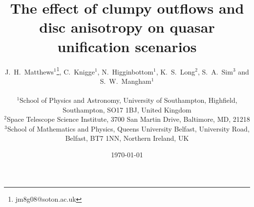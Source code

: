 \documentclass[preprint, a4paper, 11pt]{aastex}
\begin{document}


\def\py{\textsc{Python}}
\def\tar{\textsc{Tardis}}
\def\cld{\textsc{Cloudy}}
\def\agn{\textsc{Agnspec}}


\def\civ{C~\textsc{iv}}
\def\nv{N~\textsc{v}}
\def\hei{He~\textsc{i}}
\def\heii{He~\textsc{ii}}
\def\mg{Mg~\textsc{ii}}
\def\al{Al~\textsc{iii}}
\def\heii{He~\textsc{ii}}
\def\ovi{O~\textsc{vi}}
\def\la{Ly~$\alpha$}
\def\ha{H~$\alpha$}
\def\hb{H~$\beta$}



\def\araa{ARAA}
\def\nat{Nature}
\def\apjl{ApJ Letters}
\def\aapr{AAPR}
\def\ssr{SSR}
\def\apj{ApJ}
\def\apjs{ApJs}
\def\pasp{PASP}
\def\aap{A\&A}
\def\mnras{MNRAS}
\def\aj{AJ}
\def\rmxaa{RMXAA}

%
%

\title
{
The effect of clumpy outflows
and disc anisotropy on quasar unification scenarios
}



\author{
\parbox[t]{\textwidth}{
J.~H.~Matthews$^1$\thanks{jm8g08@soton.ac.uk}, C.~Knigge$^1$,
N.~Higginbottom$^1$, K.~S.~Long$^2$, S.~A.~Sim$^3$ and S.~W.~Mangham$^1$
}
\medskip  
\\$^1$School of Physics and Astronomy, University of Southampton, Highfield, Southampton, SO17 1BJ, United Kingdom
\\$^2$Space Telescope Science Institute, 3700 San Martin Drive, Baltimore, MD, 21218
\\$^3$School of Mathematics and Physics, Queens University Belfast, University Road, Belfast, BT7 1NN, Northern Ireland, UK
}

\date{\today}


%
%
\end{document}
